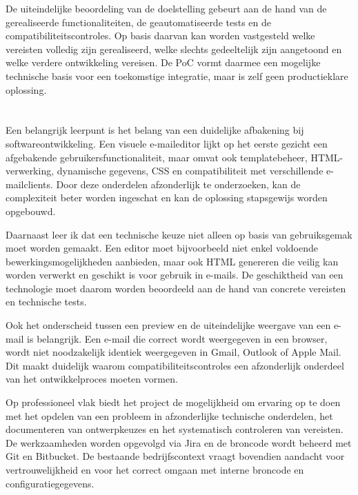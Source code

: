 De uiteindelijke beoordeling van de doelstelling gebeurt aan de hand van
de gerealiseerde functionaliteiten, de geautomatiseerde tests en de
compatibiliteitscontroles. Op basis daarvan kan worden vastgesteld welke
vereisten volledig zijn gerealiseerd, welke slechts gedeeltelijk zijn
aangetoond en welke verdere ontwikkeling vereisen. De PoC vormt daarmee
een mogelijke technische basis voor een toekomstige integratie, maar is
zelf geen productieklare oplossing.

\section{}%
\label{sec:geleerd}
Een belangrijk leerpunt is het belang van een duidelijke afbakening bij
softwareontwikkeling. Een visuele e-maileditor lijkt op het eerste gezicht
een afgebakende gebruikersfunctionaliteit, maar omvat ook templatebeheer,
HTML-verwerking, dynamische gegevens, CSS en compatibiliteit met
verschillende e-mailclients. Door deze onderdelen afzonderlijk te
onderzoeken, kan de complexiteit beter worden ingeschat en kan de oplossing
stapsgewijs worden opgebouwd.

Daarnaast leer ik dat een technische keuze niet alleen op basis van
gebruiksgemak moet worden gemaakt. Een editor moet bijvoorbeeld niet enkel
voldoende bewerkingsmogelijkheden aanbieden, maar ook HTML genereren die
veilig kan worden verwerkt en geschikt is voor gebruik in e-mails. De
geschiktheid van een technologie moet daarom worden beoordeeld aan de hand
van concrete vereisten en technische tests.

Ook het onderscheid tussen een preview en de uiteindelijke weergave van
een e-mail is belangrijk. Een e-mail die correct wordt weergegeven in een
browser, wordt niet noodzakelijk identiek weergegeven in Gmail, Outlook of
Apple Mail. Dit maakt duidelijk waarom compatibiliteitscontroles een
afzonderlijk onderdeel van het ontwikkelproces moeten vormen.

Op professioneel vlak biedt het project de mogelijkheid om ervaring op te
doen met het opdelen van een probleem in afzonderlijke technische onderdelen,
het documenteren van ontwerpkeuzes en het systematisch controleren van
vereisten. De werkzaamheden worden opgevolgd via Jira en de broncode wordt
beheerd met Git en Bitbucket. De bestaande bedrijfscontext vraagt bovendien
aandacht voor vertrouwelijkheid en voor het correct omgaan met interne
broncode en configuratiegegevens.

